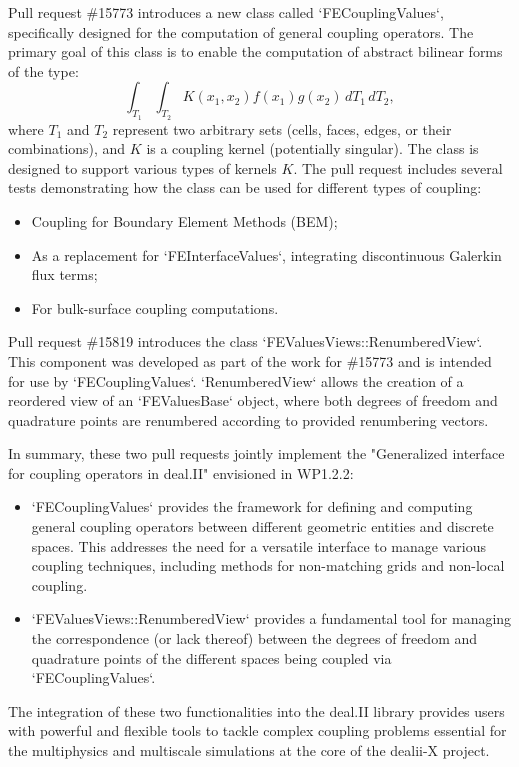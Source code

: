 \documentclass[a4paper,12pt]{article}
\begin{document}
    Pull request \#15773 introduces a new class called `FECouplingValues`, specifically designed for the computation of general coupling operators. The primary goal of this class is to enable the computation of abstract bilinear forms of the type:
    $$ \int_{T_1} \int_{T_2} K(x_1, x_2) f(x_1) g(x_2) \, dT_1 \, dT_2, $$ where
    $T_1$ and $T_2$ represent two arbitrary sets (cells, faces, edges, or their
    combinations), and $K$ is a coupling kernel (potentially singular). The
    class is designed to support various types of kernels $K$. The pull request
    includes several tests demonstrating how the class can be used for different
    types of coupling:
    \begin{itemize}
        \item Coupling for Boundary Element Methods (BEM);
        \item As a replacement for `FEInterfaceValues`, integrating
        discontinuous Galerkin flux terms;
        \item For bulk-surface coupling computations.
    \end{itemize}


    Pull request \#15819 introduces the class `FEValuesViews::RenumberedView`.
    This component was developed as part of the work for \#15773 and is intended
    for use by `FECouplingValues`. `RenumberedView` allows the creation of a
    reordered view of an `FEValuesBase` object, where both degrees of freedom
    and quadrature points are renumbered according to provided renumbering
    vectors.

    In summary, these two pull requests jointly implement the "Generalized interface for coupling operators in deal.II" envisioned in WP1.2.2:
    \begin{itemize}
        \item `FECouplingValues` provides the framework for defining and
        computing general coupling operators between different geometric
        entities and discrete spaces. This addresses the need for a versatile
        interface to manage various coupling techniques, including methods for
        non-matching grids and non-local coupling.
        \item `FEValuesViews::RenumberedView` provides a fundamental tool for managing the correspondence (or lack thereof) between the degrees of freedom and quadrature points of the different spaces being coupled via `FECouplingValues`.
    \end{itemize}

    The integration of these two functionalities into the deal.II library
    provides users with powerful and flexible tools to tackle complex coupling
    problems essential for the multiphysics and multiscale simulations at the
    core of the dealii-X project.
\end{document}
